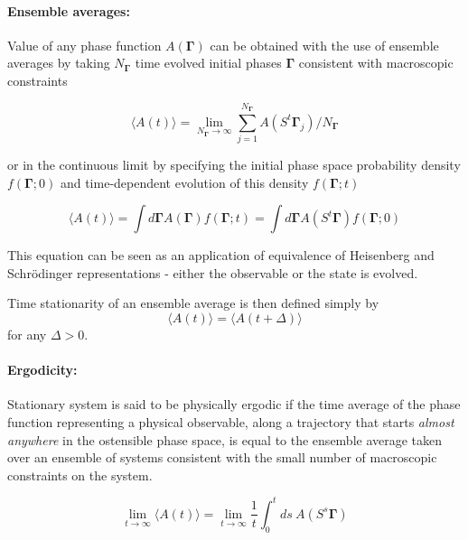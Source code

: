 \documentclass[a4paper,12pt]{article}
\begin{document}
\paragraph{Ensemble averages:}

Value of any phase function $A(\bm{\Gamma})$ can be obtained with the use of ensemble averages by taking $N_{\bm{\Gamma}} $ time evolved initial phases $\bm{\Gamma}$ consistent with macroscopic constraints

\begin{equation}
  \langle A(t) \rangle = \lim_{N_{\bm{\Gamma}}
 \to \infty} \sum_{j=1}^{N_{\bm{\Gamma}}} A(S^t \bm{\Gamma}_j)/N_{\bm{\Gamma}}
\end{equation}

or in the continuous limit by specifying the initial phase space probability density $f(\bm{\Gamma};0)$ and time-dependent evolution of this density $f(\bm{\Gamma};t)$

\begin{equation}
  \langle A(t) \rangle = \int d\bm{\Gamma} A(\bm{\Gamma}) f(\bm{\Gamma};t) = \int d\bm{\Gamma} A(S^t\bm{\Gamma})f(\bm{\Gamma};0)
\end{equation}

This equation can be seen as an application of equivalence of Heisenberg and Schrödinger representations - either the observable or the state is evolved.

Time stationarity of an ensemble average is then defined simply by
\begin{equation}
\label{StationaryStateDef}
    \langle A(t) \rangle =   \langle A(t+\Delta) \rangle
\end{equation}
for any $\Delta > 0$.


\paragraph{Ergodicity:}
Stationary system is said to be physically ergodic if the time average of the phase function representing a physical observable, along a trajectory that starts \textit{almost anywhere}\cite{Evans:2241458} in the ostensible phase space, is equal to the ensemble average taken over an ensemble of systems consistent with the small number of macroscopic constraints on the system.

\begin{equation}
    \lim_{t \to \infty} \langle A(t) \rangle = \lim_{t \to \infty} \frac{1}{t} \int_0^t ds\ A(S^s \bm{\Gamma})
\end{equation}
\end{document}
